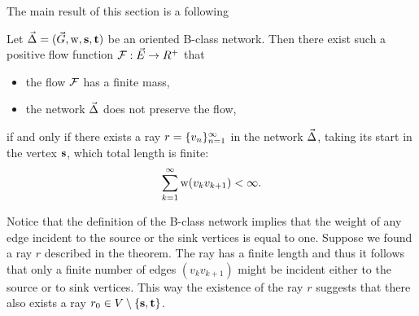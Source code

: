 \documentclass[12pt]{article}
\begin{document}
    The main result of this section is a following
    \begin{theorem}
      \label{ray-thm}
      Let $\vec{\Delta} = (\vec{G}, \mathrm{w}, \mathbf{s}, \mathbf{t})$ be an oriented B-class network.
      Then there exist such a positive flow function $\mathcal{F}: \vec{E} \to R^{+}$ that
      \begin{itemize}
        \item the flow $\mathcal{F}$ has a finite mass,
        \item the network $\vec{\Delta}$ does not preserve the flow,
      \end{itemize}
        if and only if there exists a ray $r = \{{v}_n\}_{n=1}^\infty$ in the network $\vec{\Delta}$, taking its start in the vertex $\mathbf{s}$,
          which total length is finite:
        \[
          \sum_{k=1}^\infty \mathrm{w}(v_k v_{k+1}) < \infty.
        \]
    \end{theorem}
    \begin{remark}
      \label{inner-ray-rmk}
      Notice that the definition of the B-class network implies that the weight of any edge
        incident to the source or the sink vertices is equal to one.
      Suppose we found a ray $r$ described in the theorem.
      The ray has a finite length and thus it follows that only a finite number of edges $(v_k v_{k+1})$ might
        be incident either to the source or to sink vertices.
      This way the existence of the ray $r$ suggests that there also exists a ray $r_0 \in V \setminus \left\{\mathbf{s}, \mathbf{t}\right\}$.
    \end{remark}
\end{document}
